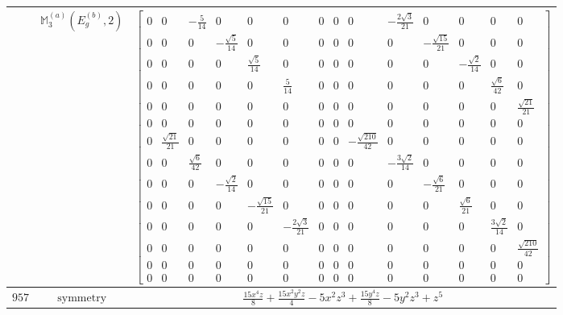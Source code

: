 \documentclass[fleqn,8pt,landscape]{jsarticle}
\begin{document}
\begin{longtable}{ccc}
$  $ & $ \mathbb{M}_{3}^{(a)}(E_{g}^{(b)},2) $ & $ \begin{bmatrix} 0 & 0 & - \frac{5}{14} & 0 & 0 & 0 & 0 & 0 & 0 & - \frac{2 \sqrt{3}}{21} & 0 & 0 & 0 & 0 \\ 0 & 0 & 0 & - \frac{\sqrt{5}}{14} & 0 & 0 & 0 & 0 & 0 & 0 & - \frac{\sqrt{15}}{21} & 0 & 0 & 0 \\ 0 & 0 & 0 & 0 & \frac{\sqrt{5}}{14} & 0 & 0 & 0 & 0 & 0 & 0 & - \frac{\sqrt{2}}{14} & 0 & 0 \\ 0 & 0 & 0 & 0 & 0 & \frac{5}{14} & 0 & 0 & 0 & 0 & 0 & 0 & \frac{\sqrt{6}}{42} & 0 \\ 0 & 0 & 0 & 0 & 0 & 0 & 0 & 0 & 0 & 0 & 0 & 0 & 0 & \frac{\sqrt{21}}{21} \\ 0 & 0 & 0 & 0 & 0 & 0 & 0 & 0 & 0 & 0 & 0 & 0 & 0 & 0 \\ 0 & \frac{\sqrt{21}}{21} & 0 & 0 & 0 & 0 & 0 & 0 & - \frac{\sqrt{210}}{42} & 0 & 0 & 0 & 0 & 0 \\ 0 & 0 & \frac{\sqrt{6}}{42} & 0 & 0 & 0 & 0 & 0 & 0 & - \frac{3 \sqrt{2}}{14} & 0 & 0 & 0 & 0 \\ 0 & 0 & 0 & - \frac{\sqrt{2}}{14} & 0 & 0 & 0 & 0 & 0 & 0 & - \frac{\sqrt{6}}{21} & 0 & 0 & 0 \\ 0 & 0 & 0 & 0 & - \frac{\sqrt{15}}{21} & 0 & 0 & 0 & 0 & 0 & 0 & \frac{\sqrt{6}}{21} & 0 & 0 \\ 0 & 0 & 0 & 0 & 0 & - \frac{2 \sqrt{3}}{21} & 0 & 0 & 0 & 0 & 0 & 0 & \frac{3 \sqrt{2}}{14} & 0 \\ 0 & 0 & 0 & 0 & 0 & 0 & 0 & 0 & 0 & 0 & 0 & 0 & 0 & \frac{\sqrt{210}}{42} \\ 0 & 0 & 0 & 0 & 0 & 0 & 0 & 0 & 0 & 0 & 0 & 0 & 0 & 0 \\ 0 & 0 & 0 & 0 & 0 & 0 & 0 & 0 & 0 & 0 & 0 & 0 & 0 & 0 \end{bmatrix} $ \\ \hline
$ 957 $ & $ \text{symmetry} $ & $ \frac{15 x^{4} z}{8} + \frac{15 x^{2} y^{2} z}{4} - 5 x^{2} z^{3} + \frac{15 y^{4} z}{8} - 5 y^{2} z^{3} + z^{5} $ \\

\end{longtable}
\end{document}
